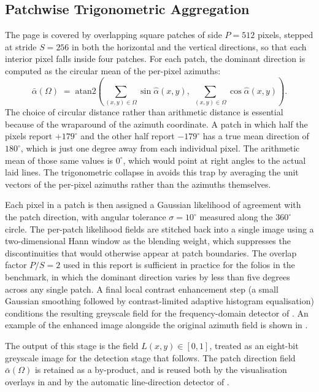 \subsection{Patchwise Trigonometric Aggregation}
\label{sec:direction:patch}

The page is covered by overlapping square patches of side
$P = 512$ pixels, stepped at stride $S = 256$ in both the horizontal
and the vertical directions, so that each interior pixel falls inside
four patches. For each patch, the dominant direction is computed as
the circular mean of the per-pixel azimuths:
\begin{equation}
  \bar\alpha(\Omega) \;=\;
      \mathrm{atan2}\!\left(
        \sum_{(x,y)\in\Omega} \sin\hat\alpha(x,y),\;
        \sum_{(x,y)\in\Omega} \cos\hat\alpha(x,y)
      \right).
  \label{eq:circmean}
\end{equation}
The choice of circular distance rather than arithmetic distance is
essential because of the wraparound of the azimuth coordinate. A
patch in which half the pixels report $+179^\circ$ and the other
half report $-179^\circ$ has a true mean direction of $180^\circ$,
which is just one degree away from each individual pixel. The
arithmetic mean of those same values is $0^\circ$, which would point
at right angles to the actual laid lines. The trigonometric collapse
in  avoids this trap by averaging the unit vectors
of the per-pixel azimuths rather than the azimuths themselves.

Each pixel in a patch is then assigned a Gaussian likelihood of
agreement with the patch direction, with angular tolerance
$\sigma = 10^\circ$ measured along the $360^\circ$ circle. The
per-patch likelihood fields are stitched back into a single image
using a two-dimensional Hann window as the blending weight, which
suppresses the discontinuities that would otherwise appear at patch
boundaries. The overlap factor $P/S = 2$ used in this report is
sufficient in practice for the folios in the benchmark, in which
the dominant direction varies by less than five degrees across any
single patch. A final local contrast enhancement step (a small
Gaussian smoothing followed by contrast-limited adaptive histogram
equalisation) conditions the resulting greyscale field for the
frequency-domain detector of . An example of
the enhanced image alongside the original azimuth field is shown
in .

The output of this stage is the field $L(x, y) \in [0, 1]$, treated
as an eight-bit greyscale image for the detection stage that follows.
The patch direction field $\bar\alpha(\Omega)$ is retained as a
by-product, and is reused both by the visualisation overlays in
 and by the automatic line-direction detector
of .
